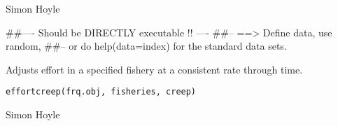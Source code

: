 \documentclass[a4paper]{book}
\begin{document}
%
\begin{Arguments}
\begin{ldescription}
\item[\code{a}] 


\item[\code{flagtype}] 


\item[\code{flag}] 


\item[\code{value}] 


\end{ldescription}
\end{Arguments}
%
\begin{Author}\relax
Simon Hoyle

\end{Author}
%
\begin{Examples}
\begin{ExampleCode}
##---- Should be DIRECTLY executable !! ----
##-- ==>  Define data, use random,
##--	or do  help(data=index)  for the standard data sets.

\end{ExampleCode}
\end{Examples}
%
\begin{Description}\relax

Adjusts effort in a specified fishery at a consistent rate through time. 
\end{Description}
%
\begin{Usage}
\begin{verbatim}
effortcreep(frq.obj, fisheries, creep)
\end{verbatim}
\end{Usage}
%
\begin{Arguments}
\begin{ldescription}
\item[\code{frq.obj}] 


\item[\code{fisheries}] 


\item[\code{creep}] 


\end{ldescription}
\end{Arguments}
%
\begin{Author}\relax

Simon Hoyle
\end{Author}
\end{document}
